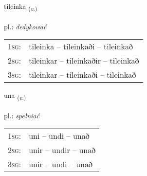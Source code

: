 \documentclass[frontgrid, backgrid]{flacards}\usepackage[]{graphicx}\usepackage[]{xcolor}
\begin{document}
\renewcommand{\blhead}{\vskip5pt {\small\bfseries\footnotesize Sagnorð | czasownik }}
\renewcommand{\bcfoot}{\vskip5pt \hspace{2pt}{\small\bfseries\footnotesize 3K}}


{tileinka \small{\textsubscript{(\textit{v.})}} \\[1ex] %
\textphonetic{[tʰɪːleiŋ̥ka]} \\
pl.: \emph{dedykować} \\  [2ex]
\renewcommand*{\arraystretch}{0.8}
\begin{tabular}{p{1cm}l}
\textsc{1sg}: & tileinka -- tileinkaði -- tileinkað \\ 
\textsc{2sg}: & tileinkar -- tileinkaðir -- tileinkað \\ 
\textsc{3sg}: & tileinkar -- tileinkaði -- tileinkað \\ 
\end{tabular}
}

\renewcommand{\flhead}{\vskip5pt \fboxsep=0pt {\small\bfseries\footnotesize Sagnorð | czasownik}}
\renewcommand{\fcfoot}{\vskip5pt \fboxsep=0pt \hspace{2pt}{\small\bfseries\footnotesize 3K}}

\renewcommand{\blhead}{\vskip5pt {\small\bfseries\footnotesize Sagnorð | czasownik }}
\renewcommand{\bcfoot}{\vskip5pt \hspace{2pt}{\small\bfseries\footnotesize 3K}}


{una \small{\textsubscript{(\textit{v.})}} \\[1ex] %
\textphonetic{[ʏːna]} \\
pl.: \emph{spełniać} \\  [2ex]
\renewcommand*{\arraystretch}{0.8}
\begin{tabular}{p{1cm}l}
\textsc{1sg}: & uni -- undi -- unað \\ 
\textsc{2sg}: & unir -- undir -- unað \\ 
\textsc{3sg}: & unir -- undi -- unað \\ 
\end{tabular}
}
\end{document}
